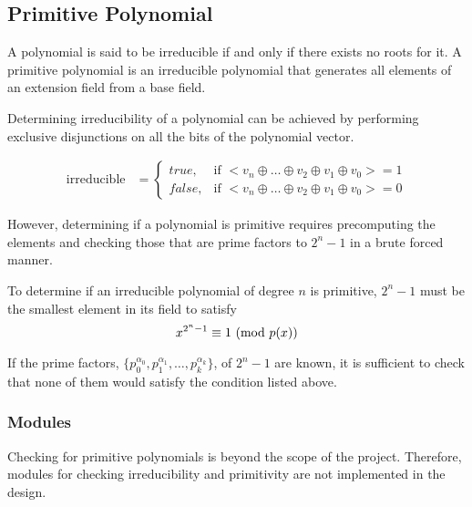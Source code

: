 \subsection{Primitive Polynomial} A polynomial is said to be irreducible if and
only if there exists no roots for it. A primitive polynomial is an irreducible
polynomial that generates all elements of an extension field from a base field.
\cite{primitive}

Determining irreducibility of a polynomial can be achieved by performing
exclusive disjunctions on all the bits of the polynomial vector.

\begin{align*}
    \text{irreducible} & =
    \begin{cases}
        true, & \text{if } < v_{n} \oplus \ldots \oplus v_{2} \oplus v_{1} \oplus v_{0} > = 1 \\
        false, & \text{if } < v_{n} \oplus \ldots \oplus v_{2} \oplus v_{1} \oplus v_{0} > = 0
    \end{cases}
\end{align*}

However, determining if a polynomial is primitive requires precomputing the
elements and checking those that are prime factors to $2^n-1$ in a brute forced
manner.

To determine if an irreducible polynomial of degree $n$ is primitive, $2^n-1$ must be the smallest element in its field to satisfy
    \begin{equation*}
        x^{2^n-1} \equiv 1 \ (\mathrm{mod}\ p(x))
    \end{equation*}

If the prime factors,
$\{p_0^{\alpha_0},p_1^{\alpha_1},\ldots,p_k^{\alpha_k}\}$, of $2^n-1$ are
known, it is sufficient to check that none of them would satisfy the condition
listed above.

    \subsubsection{Modules} Checking for primitive polynomials is beyond the
    scope of the project. Therefore, modules for checking irreducibility and
    primitivity are not implemented in the design.
